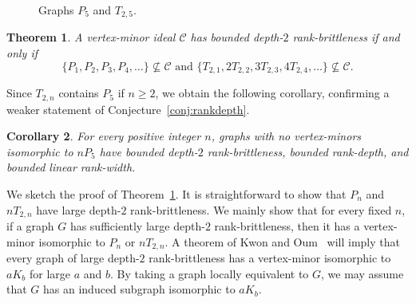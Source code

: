 \documentclass[11pt]{article}
\newtheorem{theorem}{Theorem}[section]
\newtheorem{corollary}[theorem]{Corollary}
\begin{document}
        \begin{figure}
          \centering
          \qquad\qquad
          \caption{Graphs $P_5$ and $T_{2,5}$.}
          \label{fig:t25}
        \end{figure}
        
		\begin{theorem}\label{thm:main}
		A vertex-minor ideal $\mathcal{C}$ has bounded depth-$2$ rank-brittleness if and only if 
		\[ \{P_1, P_2, P_3, P_4, \ldots \}\nsubseteq \mathcal{C}
                \text{ and }
		 \{T_{2,1}, 2T_{2,2}, 3T_{2,3}, 4T_{2,4}, \ldots \}\nsubseteq \mathcal{C}. \]
       		\end{theorem}

                Since  $T_{2,n}$ contains $P_5$ if $n\ge 2$,
                we obtain the following corollary,
                confirming a weaker statement of Conjecture~\ref{conj:rankdepth}.
	
	\begin{corollary}\label{cor:lrw}
          For every positive integer $n$,
          graphs with no vertex-minors isomorphic to $nP_5$
          have bounded depth-$2$ rank-brittleness, bounded rank-depth, and bounded linear rank-width.
	\end{corollary}
	
	We sketch the proof of Theorem~\ref{thm:main}.
	It is straightforward to show that $P_n$ and $nT_{2,n}$ have large depth-$2$ rank-brittleness.
	We mainly show that for every fixed $n$,
	if a graph $G$ has sufficiently large depth-$2$ rank-brittleness, 
	then it has a vertex-minor isomorphic to  $P_n$ or $nT_{2,n}$. 
        A theorem of Kwon and Oum~\cite[Theorem 1.4]{KO2018sca}
        will imply that every graph of large depth-$2$ rank-brittleness
        has a vertex-minor isomorphic to $aK_b$
        for large $a$ and $b$.
        By taking a graph locally equivalent to $G$, we may assume that
        $G$ has an induced subgraph isomorphic to $aK_b$.
	
\end{document}

